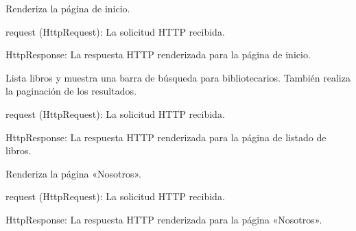 \documentclass[letterpaper,10pt,spanish]{sphinxmanual}
\begin{document}
\begin{fulllineitems}
\label{\detokenize{modules/appejemplares:appejemplares.views.inicio}}
\pysigstartsignatures
{}
\pysigstopsignatures
\sphinxAtStartPar
Renderiza la página de inicio.
\begin{description}
\sphinxAtStartPar
request (HttpRequest): La solicitud HTTP recibida.

\sphinxAtStartPar
HttpResponse: La respuesta HTTP renderizada para la página de inicio.

\end{description}

\end{fulllineitems}


\begin{fulllineitems}
\label{\detokenize{modules/appejemplares:appejemplares.views.libros}}
\pysigstartsignatures
{}
\pysigstopsignatures
\sphinxAtStartPar
Lista libros y muestra una barra de búsqueda para bibliotecarios.
También realiza la paginación de los resultados.
\begin{description}
\sphinxAtStartPar
request (HttpRequest): La solicitud HTTP recibida.

\sphinxAtStartPar
HttpResponse: La respuesta HTTP renderizada para la página de listado de libros.

\end{description}

\end{fulllineitems}


\begin{fulllineitems}
\label{\detokenize{modules/appejemplares:appejemplares.views.nosotros}}
\pysigstartsignatures
{}
\pysigstopsignatures
\sphinxAtStartPar
Renderiza la página «Nosotros».
\begin{description}
\sphinxAtStartPar
request (HttpRequest): La solicitud HTTP recibida.

\sphinxAtStartPar
HttpResponse: La respuesta HTTP renderizada para la página «Nosotros».

\end{description}

\end{fulllineitems}
\end{document}
